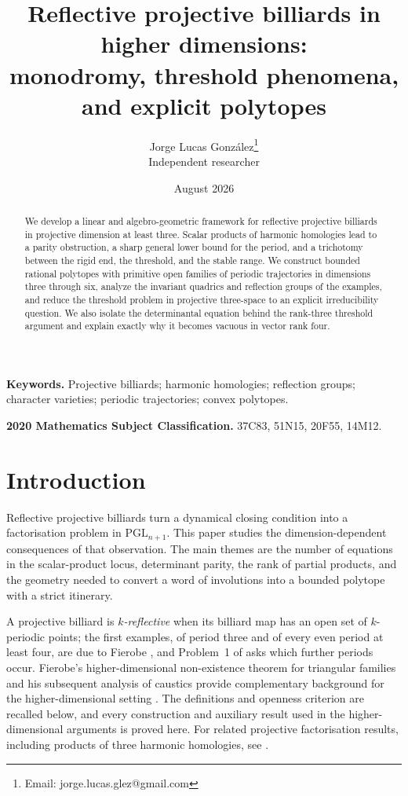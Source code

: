 \documentclass[11pt,a4paper]{article}
\title{Reflective projective billiards in higher dimensions:\\
monodromy, threshold phenomena, and explicit polytopes}
\author{Jorge Lucas Gonz\'alez\thanks{Email: jorge.lucas.glez@gmail.com}\\
\small Independent researcher}
\date{August 2026}
\theoremstyle{plain}
\theoremstyle{definition}
\theoremstyle{remark}
\newcommand{\PGL}{\mathrm{PGL}}
\begin{document}
\maketitle
\begin{abstract}
We develop a linear and algebro-geometric framework for reflective projective
billiards in projective dimension at least three.  Scalar products of harmonic
homologies lead to a parity obstruction, a sharp general lower bound for the
period, and a trichotomy between the rigid end, the threshold, and the stable
range.  We construct bounded rational polytopes with primitive open families of
periodic trajectories in dimensions three through six, analyze the invariant
quadrics and reflection groups of the examples, and reduce the threshold problem
in projective three-space to an explicit irreducibility question.  We also isolate
the determinantal equation behind the rank-three threshold argument and explain
exactly why it becomes vacuous in vector rank four.
\end{abstract}

\noindent\textbf{Keywords.} Projective billiards; harmonic homologies; reflection
groups; character varieties; periodic trajectories; convex polytopes.

\medskip
\noindent\textbf{2020 Mathematics Subject Classification.}
37C83, 51N15, 20F55, 14M12.

\section{Introduction}
Reflective projective billiards turn a dynamical closing condition into a
factorisation problem in \(\PGL_{n+1}\).  This paper studies the dimension-dependent
consequences of that observation.  The main themes are the number of equations in
the scalar-product locus, determinant parity, the rank of partial products, and
the geometry needed to convert a word of involutions into a bounded polytope with
a strict itinerary.

A projective billiard is \emph{$k$-reflective} when its billiard map has an open
set of $k$-periodic points; the first examples, of period three and of every even
period at least four, are due to Fierobe \cite{fie-ex}, and Problem~1 of
\cite{opb} asks which further periods occur.
Fierobe's higher-dimensional non-existence theorem for triangular families and
his subsequent analysis of caustics provide complementary background for the
higher-dimensional setting \cite{fie-tri,fie-caustics}.
The definitions and openness criterion are recalled below, and every construction
and auxiliary result used in the higher-dimensional arguments is proved here.
For related projective factorisation results, including products of three harmonic
homologies, see \cite{heidari-honari}.
\end{document}
